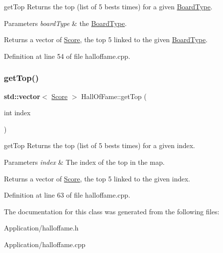 get\+Top Returns the top (list of 5 bests times) for a given \hyperlink{struct_board_type}{Board\+Type}. 


\begin{DoxyParams}{Parameters}
{\em board\+Type} & the \hyperlink{struct_board_type}{Board\+Type}. \\
\hline
\end{DoxyParams}
\begin{DoxyReturn}{Returns}
a vector of \hyperlink{class_score}{Score}, the top 5 linked to the given \hyperlink{struct_board_type}{Board\+Type}. 
\end{DoxyReturn}


Definition at line 54 of file halloffame.\+cpp.

\mbox{\label{class_hall_of_fame_ade9732fe195179e6ff7a7adecf2f4528}} 
\subsubsection{\texorpdfstring{get\+Top()}{getTop()}\hspace{0.1cm}{\footnotesize\ttfamily [2/2]}}
{\footnotesize\ttfamily \textbf{ std\+::vector}$<$ \hyperlink{class_score}{Score} $>$ Hall\+Of\+Fame\+::get\+Top (\begin{DoxyParamCaption}\item[{int}]{index }\end{DoxyParamCaption})}



get\+Top Returns the top (list of 5 bests times) for a given index. 


\begin{DoxyParams}{Parameters}
{\em index} & The index of the top in the map. \\
\hline
\end{DoxyParams}
\begin{DoxyReturn}{Returns}
a vector of \hyperlink{class_score}{Score}, the top 5 linked to the given index. 
\end{DoxyReturn}


Definition at line 63 of file halloffame.\+cpp.



The documentation for this class was generated from the following files\+:\begin{DoxyCompactItemize}
\item 
Application/halloffame.\+h\item 
Application/halloffame.\+cpp\end{DoxyCompactItemize}
